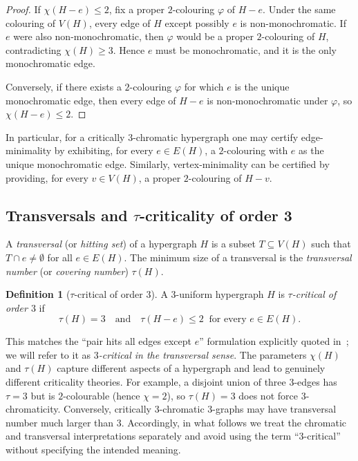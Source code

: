 \documentclass[11pt]{amsart}
\theoremstyle{definition}
\newtheorem{definition}[theorem]{Definition}
\theoremstyle{remark}
\newcommand{\V}{V}
\newcommand{\E}{E}
\begin{document}
\begin{proof}
If $\chi(H-e)\le 2$, fix a proper $2$-colouring $\varphi$ of $H-e$.
Under the same colouring of $\V(H)$, every edge of $H$ except possibly $e$ is non-monochromatic.
If $e$ were also non-monochromatic, then $\varphi$ would be a proper $2$-colouring of $H$, contradicting $\chi(H)\ge 3$.
Hence $e$ must be monochromatic, and it is the only monochromatic edge.

Conversely, if there exists a $2$-colouring $\varphi$ for which $e$ is the unique monochromatic edge, then every edge of $H-e$ is non-monochromatic under $\varphi$, so $\chi(H-e)\le 2$.
\end{proof}

In particular, for a critically $3$-chromatic hypergraph one may certify edge-minimality by exhibiting, for every $e\in \E(H)$, a $2$-colouring with $e$ as the unique monochromatic edge.
Similarly, vertex-minimality can be certified by providing, for every $v\in \V(H)$, a proper $2$-colouring of $H-v$.

\subsection{Transversals and \texorpdfstring{$\tau$}{tau}-criticality of order 3}

A \emph{transversal} (or \emph{hitting set}) of a hypergraph $H$ is a subset $T\subseteq \V(H)$ such that $T\cap e\neq\emptyset$ for all $e\in \E(H)$.
The minimum size of a transversal is the \emph{transversal number} (or \emph{covering number}) $\tau(H)$.\cite{Berge1989}

\begin{definition}[$\tau$-critical of order $3$]\label{def:tau-critical}
A $3$-uniform hypergraph $H$ is \emph{$\tau$-critical of order $3$} if
\[
\tau(H)=3
\quad\text{and}\quad
\tau(H-e)\le 2 \ \text{ for every } e\in \E(H).
\]
\end{definition}

This matches the ``pair hits all edges except $e$'' formulation explicitly quoted in~\cite{ErdosProblems834}; we will refer to it as \emph{$3$-critical in the transversal sense}.
The parameters $\chi(H)$ and $\tau(H)$ capture different aspects of a hypergraph and lead to genuinely different criticality theories.
For example, a disjoint union of three $3$-edges has $\tau=3$ but is $2$-colourable (hence $\chi=2$), so $\tau(H)=3$ does not force $3$-chromaticity.
Conversely, critically $3$-chromatic $3$-graphs may have transversal number much larger than $3$.
Accordingly, in what follows we treat the chromatic and transversal interpretations separately and avoid using the term ``$3$-critical'' without specifying the intended meaning.
\end{document}
